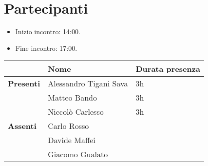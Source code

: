 \section{Partecipanti}

\begin{itemize}
    \item Inizio incontro: 14:00.
    \item Fine incontro: 17:00.
\end{itemize}


\begin{center}
{\renewcommand{\arraystretch}{1.5}
\begin{tabular}{lll}
	                    & \textbf{Nome}  & \textbf{Durata presenza} 	\\
	\hline
	\textbf{Presenti}   & Alessandro Tigani Sava	& 3h     \\
						& Matteo Bando				& 3h		\\
						& Niccolò Carlesso			& 3h		\\
	\hline
	\textbf{Assenti}	& Carlo Rosso				&			\\
						& Davide Maffei             &	        \\
						& Giacomo Gualato			&			\\
\end{tabular}	
}
\end{center}